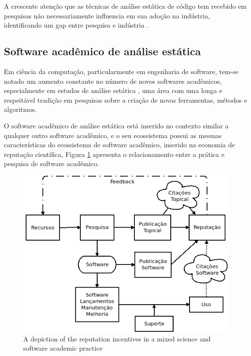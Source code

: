 A crescente atenção que as técnicas de análise estática de código tem
recebido em pesquisas não necessariamente influencia em sua adoção na indústria,
identificando um gap entre pesquisa e indústria \cite{ilyas2016static}.



\subsection{Software acadêmico de análise estática}

Em ciência da computação, particularmente em engenharia de software, tem-se
notado um aumento constante no número de novos softwares acadêmicos,
especialmente em estudos de análise estática \cite{allen2017engineering}, 
uma área com uma longa e respeitável tradição em
pesquisas sobre a criação de novas ferramentas, métodos e algoritmos.


O software acadêmico de análise estática está inserido no contexto similar
a qualquer outro software acadêmico, e o seu ecossistema possui as mesmas
características do ecossistema de software acadêmico, inserido na economia
de reputação científica, Figura \ref{scientific-reputation-diagram} apresenta
o relacionamento entre a prática e pesquisa de software acadêmico.

\begin{figure}[h]
  \center
  \includegraphics[scale=0.5]{imagens/scientific-reputation-diagram.png}
  \caption{A depiction of the reputation incentives in a mixed science and software academic practice \cite{howison2011scientific}}
  \label{scientific-reputation-diagram}
\end{figure}

